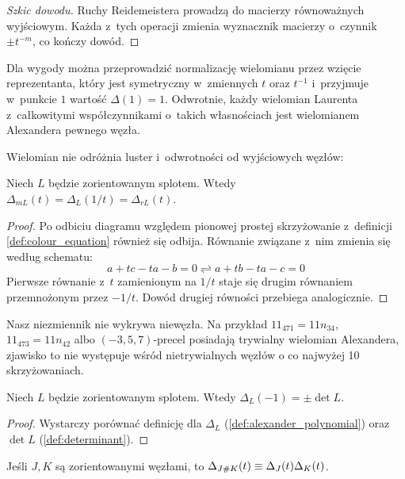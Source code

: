 \begin{proof}[Szkic dowodu]
    Ruchy Reidemeistera prowadzą do macierzy równoważnych wyjściowym.
    Każda z~tych operacji zmienia wyznacznik macierzy o~czynnik $\pm t^{-m}$, co kończy dowód.
\end{proof}

Dla wygody można przeprowadzić normalizację wielomianu przez wzięcie reprezentanta, który jest symetryczny w~zmiennych $t$ oraz $t^{-1}$ i~przyjmuje w~punkcie $1$ wartość $\Delta(1) = 1$.
Odwrotnie, każdy wielomian Laurenta z~całkowitymi współczynnikami o~takich własnościach jest wielomianem Alexandera pewnego węzła.

Wielomian nie odróżnia luster i~odwrotności od wyjściowych węzłów:

\begin{proposition}
    \label{prp:alexander_mirror_reverse}
    Niech $L$ będzie zorientowanym splotem.
    Wtedy $\Delta_{mL}(t) = \Delta_L(1/t) = \Delta_{rL}(t)$.
\end{proposition}

\begin{proof}
    Po odbiciu diagramu względem pionowej prostej skrzyżowanie z~definicji \ref{def:colour_equation} również się odbija.
    Równanie związane z~nim zmienia się według schematu:
    \begin{equation}
        a + tc - ta - b = 0 \rightleftharpoons a + tb - ta - c = 0
    \end{equation}
    Pierwsze równanie z~$t$ zamienionym na $1/t$ staje się drugim równaniem przemnożonym przez $-1/t$.
    Dowód drugiej równości przebiega analogicznie.
\end{proof}

Nasz niezmiennik nie wykrywa niewęzła.
Na przykład $11_{471} = 11n_{34}$, $11_{473} = 11n_{42}$ albo $(-3, 5, 7)$-precel posiadają trywialny wielomian Alexandera, zjawisko to nie występuje wśród nietrywialnych węzłów o co najwyżej 10 skrzyżowaniach.

\begin{proposition}
    \label{prp:alexander_det}
    Niech $L$ będzie zorientowanym splotem.
    Wtedy $\Delta_L(-1) = \pm \det L$.
\end{proposition}

\begin{proof}
    Wystarczy porównać definicję dla $\Delta_L$ (\ref{def:alexander_polynomial}) oraz $\det L$ (\ref{def:determinant}).
\end{proof}

\begin{proposition}
    Jeśli $J, K$ są zorientowanymi węzłami, to $\Delta_{J \mathbin{\#} K}(t) \equiv \Delta_J(t) \Delta_K(t)$.
\end{proposition}

